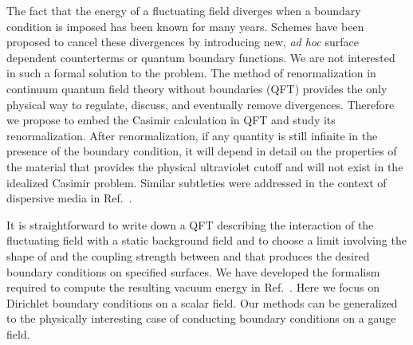 \documentclass[a4paper,aps,amsfonts,prl,showpacs,nobibnotes,nofootinbib,%
tightenlines,twocolumn]{revtex4}
\providecommand{\vek}[1]{\mathbf{#1}}
\begin{document}
The fact that the energy of a fluctuating field diverges when a
boundary condition is imposed has been known for many years\cite{C&D,
Candelas}.  Schemes have been proposed to cancel these divergences by
introducing new, {\it ad hoc\/} surface dependent
counterterms\cite{Symanzik} or quantum boundary functions\cite{Actor}. 
We are not interested in such a formal solution to the problem. The
method of renormalization in continuum quantum field theory
without boundaries (QFT) provides the only physical way to
regulate, discuss, and eventually remove divergences.  Therefore we
propose to embed the Casimir calculation in QFT and study its
renormalization.  After renormalization, if any quantity is still
infinite in the presence of the boundary condition, it will depend in
detail on the properties of the material that provides the physical
ultraviolet cutoff and will not exist in the idealized Casimir
problem.  Similar subtleties were addressed in the context of
dispersive media in Ref.~\cite{Barton}.

It is straightforward to write down a QFT describing the interaction
of the fluctuating field \myHighlight{$\phi$}\coordHE{} with a static background field
\myHighlight{$\sigma(\vek x)$}\coordHE{} and to choose a limit involving the shape of
\myHighlight{$\sigma(\vek x)$}\coordHE{} and the coupling strength between \myHighlight{$\phi$}\coordHE{} and \myHighlight{$\sigma$}\coordHE{}
that produces the desired boundary conditions on specified surfaces. 
We have developed the formalism required to compute the resulting
vacuum energy in Ref.~\cite{dens}.   Here we focus on Dirichlet
boundary conditions on a scalar field.  Our methods can be generalized
to the physically interesting case of conducting boundary conditions
on a gauge field.
\end{document}

